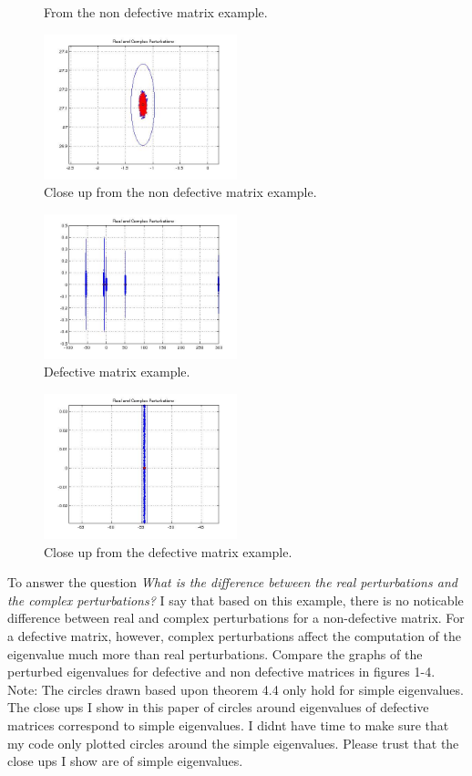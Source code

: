\documentclass[a4paper]{article}
\begin{document}
\begin{enumerate}
\begin{center}
\begin{figure}
\caption{From the non defective matrix example.}
\end{figure}
\begin{figure}
\centering
\includegraphics[width=0.5\textwidth]{2.jpg}
\caption{Close up from the non defective matrix example.}
\end{figure}
\begin{figure}
\centering
\includegraphics[width=0.5\textwidth]{degen2.jpg}
\caption{Defective matrix example.}
\end{figure}
\begin{figure}
\centering
\includegraphics[width=0.5\textwidth]{degen2zoom.jpg}
\caption{Close up from the defective matrix example.}
\end{figure}
\end{center}

To answer the question \emph{What is the difference between the real perturbations and the complex perturbations?} I say that based on this example, there is no noticable difference between real and complex perturbations for a non-defective matrix. For a defective matrix, however, complex perturbations affect the computation of the eigenvalue much more than real perturbations. Compare the graphs of the perturbed eigenvalues for defective and non defective matrices in figures 1-4. Note: The circles drawn based upon theorem 4.4 only hold for simple eigenvalues. The close ups I show in this paper of circles around eigenvalues of defective matrices correspond to simple eigenvalues. I didnt have time to make sure that my code only plotted circles around the simple eigenvalues. Please trust that the close ups I show are of simple eigenvalues.


\end{enumerate}
\end{document}
